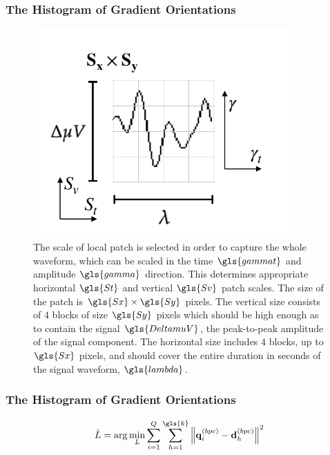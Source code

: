 \documentclass[aspectratio=169]{beamer}
\begin{document}
\begin{frame}
\frametitle{The Histogram of Gradient Orientations}
\begin{center}
\begin{figure}[h!]
\centering
\includegraphics[width=10cm]{images/patchgeometry.pdf}
\caption[Patch Geometry]{The scale of local patch is selected in order to capture the whole waveform, which can be scaled in the time $\gls{gammat}$ and amplitude $\gls{gamma}$ direction.  This determines appropriate horizontal $\gls{St}$ and vertical $\gls{Sv}$ patch scales.  The size of the patch is $\gls{Sx} \times \gls{Sy}$ pixels. The vertical size consists of $4$ blocks of size $\gls{Sy}$ pixels which should be high enough as to contain the signal $\gls{DeltamuV}$, the peak-to-peak amplitude of the signal component. The horizontal size includes $4$ blocks, up to $\gls{Sx}$ pixels, and should cover the entire duration in seconds of the signal waveform, $\gls{lambda}$.   }
\label{fig:patchgeometry}
\end{figure}
\end{center}
\end{frame}

\begin{frame}
\frametitle{The Histogram of Gradient Orientations}
\begin{center}
\begin{equation}
\hat{L} = \arg \min_{L} \sum_{i=1}^{Q} \sum_{h=1}^{\gls{k}} {\left\lVert \mathbf{q}_{i}^{(bpc)} -  \mathbf{d}_{h}^{(bpc)} \right\rVert}  ^{2} 
\label{eq:classification}
\end{equation}
\end{center}
\end{frame}
\end{document}
